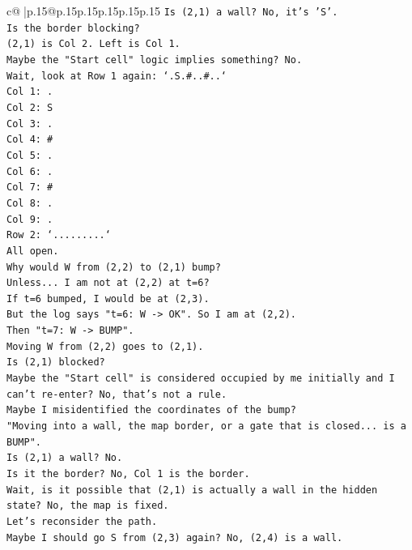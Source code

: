 \documentclass{article}
\begin{document}
{\begin{supertabular}{c@{$\;$}|p{.15\linewidth}@{}p{.15\linewidth}p{.15\linewidth}p{.15\linewidth}p{.15\linewidth}p{.15\linewidth}}
{{{\texttt{Is (2,1) a wall? No, it's 'S'.} \\
\texttt{Is the border blocking?} \\
\texttt{(2,1) is Col 2. Left is Col 1.} \\
\texttt{Maybe the "Start cell" logic implies something? No.} \\
\texttt{Wait, look at Row 1 again: `.S.\#..\#..`} \\
\texttt{Col 1: .} \\
\texttt{Col 2: S} \\
\texttt{Col 3: .} \\
\texttt{Col 4: \#} \\
\texttt{Col 5: .} \\
\texttt{Col 6: .} \\
\texttt{Col 7: \#} \\
\texttt{Col 8: .} \\
\texttt{Col 9: .} \\
\texttt{Row 2: `.........`} \\
\texttt{All open.} \\
\texttt{Why would W from (2,2) to (2,1) bump?} \\
\texttt{Unless... I am not at (2,2) at t=6?} \\
\texttt{If t=6 bumped, I would be at (2,3).} \\
\texttt{But the log says "t=6: W {-}> OK". So I am at (2,2).} \\
\texttt{Then "t=7: W {-}> BUMP".} \\
\texttt{Moving W from (2,2) goes to (2,1).} \\
\texttt{Is (2,1) blocked?} \\
\texttt{Maybe the "Start cell" is considered occupied by me initially and I can't re{-}enter? No, that's not a rule.} \\
\texttt{Maybe I misidentified the coordinates of the bump?} \\
\texttt{"Moving into a wall, the map border, or a gate that is closed... is a BUMP".} \\
\texttt{Is (2,1) a wall? No.} \\
\texttt{Is it the border? No, Col 1 is the border.} \\
\texttt{Wait, is it possible that (2,1) is actually a wall in the hidden state? No, the map is fixed.} \\
\texttt{Let's reconsider the path.} \\
\texttt{Maybe I should go S from (2,3) again? No, (2,4) is a wall.} \\
}}}
\end{supertabular}}
\end{document}
